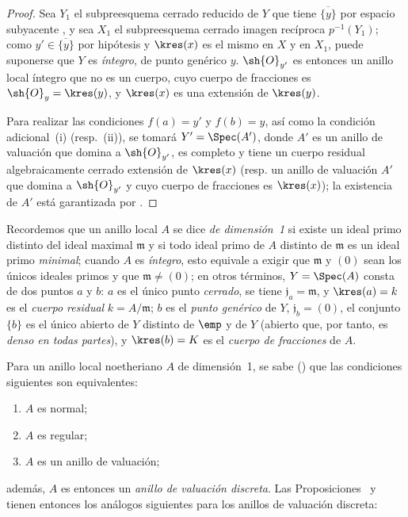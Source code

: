\documentclass[oneside,10pt]{amsart}
\newcommand{\oldpage}[2][]{\marginnote{\normalfont\footnotesize\textbf{#1}~|~#2}\ignorespaces}
\let\EGAOriginalLabel\label
\renewcommand{\label}[1]{\phantomsection\EGAOriginalLabel{#1}}
\begin{document}
\begin{proof}
Sea $Y_1$ el subpreesquema cerrado reducido de $Y$ que tiene $\overline{\{y\}}$ por espacio subyacente , y sea $X_1$ el subpreesquema cerrado imagen recíproca $p^{-1}(Y_1)$;
como $y'\in\overline{\{y\}}$ por hipótesis y $\kres(x)$ es el mismo en $X$ y en $X_1$, puede suponerse que $Y$ es \emph{íntegro}, de punto genérico $y$.
$\sh{O}_{y'}$ es entonces un anillo local íntegro que no es un cuerpo, cuyo cuerpo de fracciones es $\sh{O}_y=\kres(y)$, y $\kres(x)$ es una extensión de $\kres(y)$.

Para realizar las condiciones $f(a)=y'$ y $f(b)=y$, así como la condición adicional~(i) (resp.~(ii)), se tomará $Y'=\Spec(A')$, donde $A'$ es un anillo de valuación que domina a $\sh{O}_{y'}$, es completo y tiene un cuerpo residual algebraicamente cerrado extensión de $\kres(x)$ (resp. un anillo de valuación $A'$ que domina a $\sh{O}_{y'}$ y cuyo cuerpo de fracciones es $\kres(x)$);
la existencia de $A'$ está garantizada por .
\end{proof}

\begin{env}[7.1.5]
\label{II.7.1.5}
Recordemos que un anillo local $A$ se dice \emph{de dimensión~1} si existe un ideal primo distinto del ideal maximal $\mathfrak{m}$ y si todo ideal primo de $A$ distinto de $\mathfrak{m}$ es un ideal primo \emph{minimal};
cuando $A$ es \emph{íntegro}, esto equivale a exigir que $\mathfrak{m}$ y $(0)$ sean los únicos ideales primos y que $\mathfrak{m}\neq(0)$;
en otros términos, $Y=\Spec(A)$ consta de dos
\oldpage[II]{140}
puntos $a$ y $b$: $a$ es el único punto \emph{cerrado}, se tiene $\mathfrak{j}_a=\mathfrak{m}$, y $\kres(a)=k$ es el \emph{cuerpo residual} $k=A/\mathfrak{m}$;
$b$ es el \emph{punto genérico} de $Y$, $\mathfrak{j}_b=(0)$, el conjunto $\{b\}$ es el único abierto de $Y$ distinto de $\emp$ y de $Y$ (abierto que, por tanto, es \emph{denso en todas partes}), y $\kres(b)=K$ es el \emph{cuerpo de fracciones} de $A$.
\end{env}

\begin{env}[7.1.6]
\label{II.7.1.6}
Para un anillo local noetheriano $A$ de dimensión~1, se sabe (\cite[pp.~2-08 y 17-01]{I-1}) que las condiciones siguientes son equivalentes:
\begin{enumerate}
  \item[\rm{(a)}] $A$ es normal;
  \item[\rm{(b)}] $A$ es regular;
  \item[\rm{(c)}] $A$ es un anillo de valuación;
\end{enumerate}
además, $A$ es entonces un \emph{anillo de valuación discreta}.
Las Proposiciones~ y  tienen entonces los análogos siguientes para los anillos de valuación discreta:
\end{env}
\end{document}
